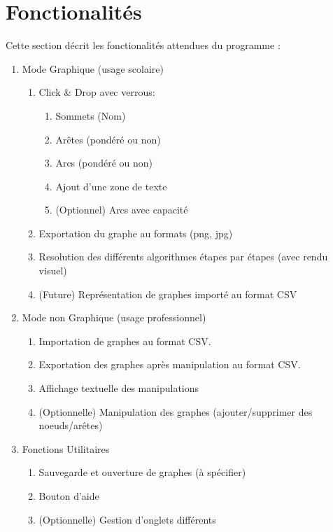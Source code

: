 \documentclass[french]{article}
\begin{document}
	\section{Fonctionalités}
    Cette section décrit les fonctionalités attendues du programme :
		\begin{enumerate}
			\item Mode Graphique (usage scolaire)
			\begin{enumerate}
        \item Click \& Drop avec verrous:
        \begin{enumerate}
          \item Sommets (Nom)
          \item Arêtes (pondéré ou non)
          \item Arcs (pondéré ou non)
          \item Ajout d'une zone de texte
          \item (Optionnel) Arcs avec capacité
        \end{enumerate}
				\item Exportation du graphe au formats (png, jpg)
        \item Resolution des différents algorithmes étapes par étapes (avec rendu visuel)
        \item (Future) Représentation de graphes importé au format CSV
			 \end{enumerate}

		   \item Mode non Graphique (usage professionnel)
       \begin{enumerate}
 				\item Importation de graphes au format CSV.
 				\item Exportation des graphes après manipulation au format CSV.
        \item Affichage textuelle des manipulations
 				\item (Optionnelle) Manipulation des graphes (ajouter/supprimer des noeuds/arêtes)
 			\end{enumerate}

      \item Fonctions Utilitaires
			\begin{enumerate}
				\item Sauvegarde et ouverture de graphes (à spécifier)
				\item Bouton d'aide
				\item (Optionnelle) Gestion d'onglets différents
			\end{enumerate}
		\end{enumerate}
\end{document}
